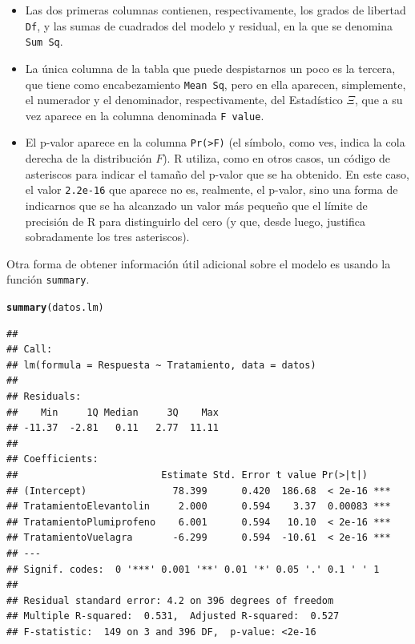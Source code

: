 \documentclass[10pt,a4paper]{article}\usepackage[]{graphicx}\usepackage[]{color}
\makeatletter
\newcommand{\hlstd}[1]{\textcolor[rgb]{0.345,0.345,0.345}{#1}}%
\newcommand{\hlkwd}[1]{\textcolor[rgb]{0.737,0.353,0.396}{\textbf{#1}}}%
\newenvironment{kframe}{%
 \def\at@end@of@kframe{}%
 \ifinner\ifhmode%
  \def\at@end@of@kframe{\end{minipage}}%
  \begin{minipage}{\columnwidth}%
 \fi\fi%
 \def\FrameCommand##1{\hskip\@totalleftmargin \hskip-\fboxsep
 \colorbox{shadecolor}{##1}\hskip-\fboxsep
     \hskip-\linewidth \hskip-\@totalleftmargin \hskip\columnwidth}%
 \MakeFramed {\advance\hsize-\width
   \@totalleftmargin\z@ \linewidth\hsize
   \@setminipage}}%
 {\par\unskip\endMakeFramed%
 \at@end@of@kframe}
\newenvironment{knitrout}{}{} %
\newcounter {cont01}
\makeatother
\begin{document}
\begin{itemize}
  \item Las dos primeras columnas contienen, respectivamente, los grados de libertad {\tt Df}, y las sumas de cuadrados del modelo y residual, en la que se denomina {\tt Sum Sq}.
  \item La única columna de la tabla que puede despistarnos un poco es la tercera, que tiene como encabezamiento {\tt Mean Sq}, pero en ella aparecen, simplemente, el numerador y el denominador, respectivamente, del Estadístico $\Xi$, que a su vez aparece en la columna denominada {\tt F value}.
  \item El p-valor aparece en la columna {\tt Pr(>F)} (el símbolo, como ves, indica la cola derecha de la distribución $F$). R utiliza, como en otros casos, un código de asteriscos para indicar el tamaño del p-valor que se ha obtenido. En este caso, el valor {\tt 2.2e-16} que aparece no es, realmente, el p-valor, sino una forma de indicarnos que se ha alcanzado un valor más pequeño que el límite de precisión de R para distinguirlo del cero (y que, desde luego, justifica sobradamente los tres asteriscos).
\end{itemize}

Otra forma de obtener información útil adicional sobre el modelo es usando la función {\tt summary}.
\begin{knitrout}
\color{fgcolor}\begin{kframe}
\begin{alltt}
\hlkwd{summary}\hlstd{(datos.lm)}
\end{alltt}
\begin{verbatim}
## 
## Call:
## lm(formula = Respuesta ~ Tratamiento, data = datos)
## 
## Residuals:
##    Min     1Q Median     3Q    Max 
## -11.37  -2.81   0.11   2.77  11.11 
## 
## Coefficients:
##                         Estimate Std. Error t value Pr(>|t|)    
## (Intercept)               78.399      0.420  186.68  < 2e-16 ***
## TratamientoElevantolin     2.000      0.594    3.37  0.00083 ***
## TratamientoPlumiprofeno    6.001      0.594   10.10  < 2e-16 ***
## TratamientoVuelagra       -6.299      0.594  -10.61  < 2e-16 ***
## ---
## Signif. codes:  0 '***' 0.001 '**' 0.01 '*' 0.05 '.' 0.1 ' ' 1
## 
## Residual standard error: 4.2 on 396 degrees of freedom
## Multiple R-squared:  0.531,	Adjusted R-squared:  0.527 
## F-statistic:  149 on 3 and 396 DF,  p-value: <2e-16
\end{verbatim}
\end{kframe}
\end{knitrout}
\end{document}
